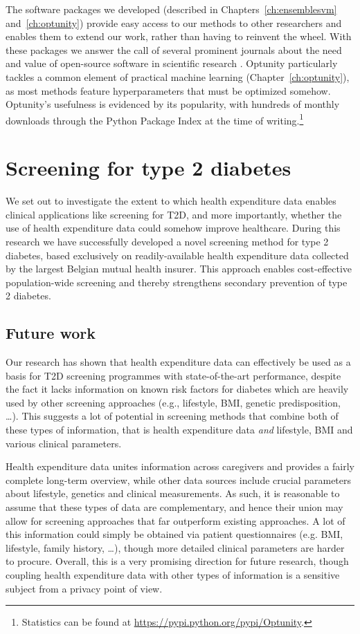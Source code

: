 The software packages we developed (described in Chapters~\ref{ch:ensemblesvm} and~\ref{ch:optunity}) provide easy access to our methods to other researchers and enables them to extend our work, rather than having to reinvent the wheel. With these packages we answer the call of several prominent journals about the need and value of open-source software in scientific research \citep{sonnenburg2007need,prlic2012ten}. Optunity particularly tackles a common element of practical machine learning (Chapter~\ref{ch:optunity}), as most methods feature hyperparameters that must be optimized somehow. Optunity's usefulness is evidenced by its popularity, with hundreds of monthly downloads through the Python Package Index at the time of writing.\footnote{Statistics can be found at \url{https://pypi.python.org/pypi/Optunity}.}

\section{Screening for type 2 diabetes} \label{conclusion:screening}
We set out to investigate the extent to which health expenditure data enables clinical applications like screening for T2D, and more importantly, whether the use of health expenditure data could somehow improve healthcare. During this research we have successfully developed a novel screening method for type 2 diabetes, based exclusively on readily-available health expenditure data collected by the largest Belgian mutual health insurer. This approach enables cost-effective population-wide screening and thereby strengthens secondary prevention of type 2 diabetes.

\subsection{Future work} 

Our research has shown that health expenditure data can effectively be used as a basis for T2D screening programmes with state-of-the-art performance, despite the fact it lacks information on known risk factors for diabetes which are heavily used by other screening approaches (e.g., lifestyle, BMI, genetic predisposition, \ldots). This suggests a lot of potential in screening methods that combine both of these types of information, that is health expenditure data \emph{and} lifestyle, BMI and various clinical parameters. 

Health expenditure data unites information across caregivers and provides a fairly complete long-term overview, while other data sources include crucial parameters about lifestyle, genetics and clinical measurements. As such, it is reasonable to assume that these types of data are complementary, and hence their union may allow for screening approaches that far outperform existing approaches. A lot of this information could simply be obtained via patient questionnaires (e.g. BMI, lifestyle, family history, \ldots), though more detailed clinical parameters are harder to procure. Overall, this is a very promising direction for future research, though coupling health expenditure data with other types of information is a sensitive subject from a privacy point of view.

